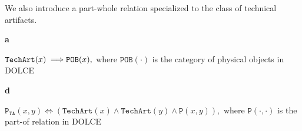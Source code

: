 \documentclass[sw]{iosart2x}
\newcommand{\bflist}{\begin{list}{}{\setlength{\topsep}{2mm}\setlength{\partopsep}{0mm}\setlength{\parsep}{0mm}\setlength{\leftmargin}{9mm}\setlength{\labelwidth}{8mm}}}
\newcommand{\eflist}{\end{list}}
\newcommand{\AxLabel}{\textrm{a}}
\newcommand{\DefLabel}{\textrm{d}}
\newcounter{cntax}
\newcommand{\myax}[1]{\refstepcounter{cntax}\begin{small}{\bf \AxLabel\thecntax\label{ax:#1}}\end{small}}
\newcounter{cntdef}
\newcommand{\mydf}[1]{\refstepcounter{cntdef}\begin{small}{\bf \DefLabel\thecntdef\label{def:#1}}\end{small}}
\newcommand{\generalStyle}[1]{\texttt{#1}}
\newcommand{\biRel}[3]{\generalStyle{#1}(#2,#3)}
\newcommand{\uniRel}[2]{\generalStyle{#1}(#2)}
\newcommand{\biRelPar}[4]{\generalStyle{#1}_{\generalStyle{#4}}(#2,#3)}
\newcommand{\myiff}{\Longleftrightarrow}
\newcommand{\myfi}{\hspace{0.9mm} \Longrightarrow}
\newcommand{\DOLCE}{\textsc{DOLCE}\xspace} %
\newcommand{\DOLCEPhysObj}[1]{\uniRel{{POB}}{#1}}
\newcommand{\DOLCEPart}[2]{\biRel{{P}}{#1}{#2}}
\newcommand{\TechArt}[1]{\uniRel{TechArt}{#1}}
\newcommand{\Component}[1]{\uniRel{Component}{#1}}
\newcommand{\partTA}[2]{\biRelPar{P}{#1}{#2}{TA}}
\newcommand{\firstTimeKeyWord}[1]{\textit{#1}}
\newcommand{\TODO}[1]{{\color{red} #1}}
\newcommand{\TODOinline}[1]{{\color{red} #1}}
\begin{document}

We also introduce a part-whole relation specialized to the class of technical artifacts.
\bflist
\item[\myax{subsumptionTArt}] $ \TechArt{x} \myfi \DOLCEPhysObj{x},$ where $\DOLCEPhysObj{\cdot}$ is the category of physical objects in \DOLCE%
\item[\mydf{partTA}] $ \partTA{x}{y} \myiff (\TechArt{x} \land \TechArt{y} \land  \DOLCEPart{x}{y}),$ where $\DOLCEPart{\cdot}{\cdot}$ is the part-of relation in \DOLCE%
\eflist
\end{document}
